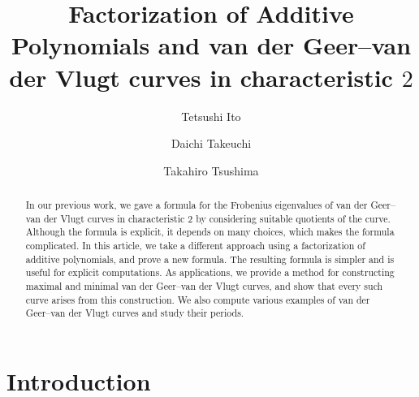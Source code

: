 \documentclass[12pt,a4paper]{amsart}
\theoremstyle{definition}
\theoremstyle{remark}
\begin{document}
\title[Additive Polynomial Factorization \& 
 van der Geer--van der Vlugt curves]{Factorization of Additive Polynomials and van der Geer--van der Vlugt curves in characteristic $2$}

\author{Tetsushi Ito}
\address{
Department of Mathematics, Faculty of Science, Kyoto University
Kyoto, 606--8502, Japan}

\author{Daichi Takeuchi}
\address{Department of Mathematics,
Institute of Science Tokyo,
2-12-1 Ookayama, Meguro-ku, Tokyo, 152-8551, Japan
}

\author{Takahiro Tsushima}
\address{
Keio University School of Medicine,
4-1-1 Hiyoshi, Kohoku-ku,
Yokohama, 223-8521, Japan}

\date{}



\begin{abstract}
In our previous work, we gave a formula for the Frobenius eigenvalues of van der Geer--van der Vlugt curves in characteristic $2$ by considering suitable quotients of the curve. 
Although the formula is explicit, it depends on many choices, which makes the formula complicated.
In this article, we take a different approach using a factorization of additive polynomials, and prove a new formula. The resulting formula is simpler and is useful for explicit computations. 
As applications, we provide a method for constructing maximal and minimal van der Geer--van der Vlugt curves, and show that every such curve arises from this construction. We also compute various examples of van der Geer--van der Vlugt  curves and study their periods. 
\end{abstract}

\maketitle

\section{Introduction}
\label{Introduction}
\end{document}
